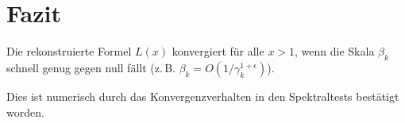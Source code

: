 \documentclass[12pt]{article}
\begin{document}
\section*{Fazit}

Die rekonstruierte Formel $L(x)$ konvergiert für alle $x > 1$, wenn die Skala $\beta_k$ schnell genug gegen null fällt (z.\,B. $\beta_k = O(1/\gamma_k^{1+\epsilon})$).

Dies ist numerisch durch das Konvergenzverhalten in den Spektraltests bestätigt worden.
\end{document}
